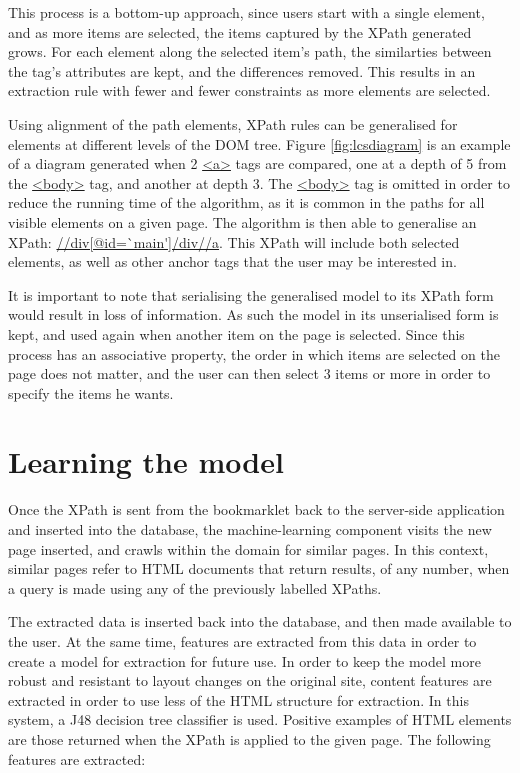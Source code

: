 This process is a bottom-up approach, since users start with a single element, and as more items are selected, the items captured by the XPath generated grows. For each element along the selected item's path, the similarties between the tag's attributes are kept, and the differences removed. This results in an extraction rule with fewer and fewer constraints as more elements are selected.




Using alignment of the path elements, XPath rules can be generalised for elements at different levels of the DOM tree. Figure \ref{fig:lcsdiagram} is an example of a diagram generated when 2 \url{<a>} tags are compared, one at a depth of 5 from the \url{<body>} tag, and another at depth 3. The \url{<body>} tag is omitted in order to reduce the running time of the algorithm, as it is common in the paths for all visible elements on a given page. The algorithm is then able to generalise an XPath: \url{//div[@id=`main']/div//a}. This XPath will include both selected elements, as well as other anchor tags that the user may be interested in.




It is important to note that serialising the generalised model to its XPath form would result in loss of information. As such the model in its unserialised form is kept, and used again when another item on the page is selected. Since this process has an associative property, the order in which items are selected on the page does not matter, and the user can then select 3 items or more in order to specify the items he wants.

\section{Learning the model}\label{classificationmodel}
	Once the XPath is sent from the bookmarklet back to the server-side application and inserted into the database, the machine-learning component visits the new page inserted, and crawls within the domain for similar pages. In this context, similar pages refer to HTML documents that return results, of any number, when a query is made using any of the previously labelled XPaths. 


	The extracted data is inserted back into the database, and then made available to the user. At the same time, features are extracted from this data in order to create a model for extraction for future use. In order to keep the model more robust and resistant to layout changes on the original site, content features are extracted in order to use less of the HTML structure for extraction. In this system, a J48 decision tree classifier is used. Positive examples of HTML elements are those returned when the XPath is applied to the given page. The following features are extracted:

